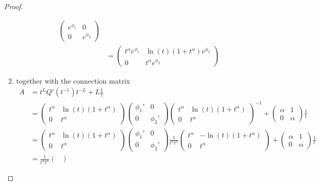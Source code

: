 \begin{proof}
\begin{enumerate}
\begin{align*}
\begin{pmatrix}
          e^{\phi_1} & 0 \\ 0 & e^{\phi_2}
        \end{pmatrix}
        \\&=\begin{pmatrix}
          t^\alpha e^{\phi_1} & \ln(t)(1+t^\alpha)e^{\phi_2}
          \\0 & t^\alpha e^{\phi_2}
        \end{pmatrix}
      \end{align*}
    \item together with the connection matrix
      \begin{align*}
        A&=t^LQ'(t^{-1})t^{-L}+L\frac{1}{t}
        \\&= \begin{pmatrix}
          t^\alpha & \ln(t)(1+t^\alpha)
          \\0 & t^\alpha
        \end{pmatrix} \begin{pmatrix}
          \phi_1' & 0 \\ 0 & \phi_2'
        \end{pmatrix} \begin{pmatrix}
          t^\alpha & \ln(t)(1+t^\alpha)
          \\0 & t^\alpha
        \end{pmatrix}^{-1}
        +
        \begin{pmatrix} \alpha & 1 \\ 0 & \alpha \end{pmatrix} \frac{1}{t}
        \\&= \begin{pmatrix}
          t^\alpha & \ln(t)(1+t^\alpha)
          \\0 & t^\alpha
        \end{pmatrix} \begin{pmatrix}
          \phi_1' & 0 \\ 0 & \phi_2'
        \end{pmatrix} 
        \frac{1}{t^\alpha t^\alpha}
        \begin{pmatrix}
          t^\alpha & -\ln(t)(1+t^\alpha)
          \\ 0 & t^\alpha
        \end{pmatrix}
        +
        \begin{pmatrix} \alpha & 1 \\ 0 & \alpha \end{pmatrix} \frac{1}{t}
        \\&= \frac{1}{t^\alpha t^\alpha} \begin{pmatrix}

\end{pmatrix}
\end{align*}
\end{enumerate}
\end{proof}
